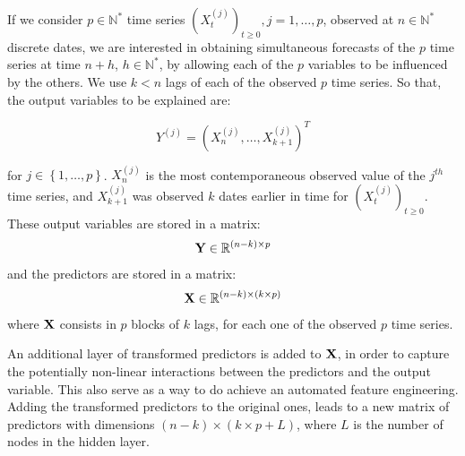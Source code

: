 \medskip

If we consider $p \in \mathbb{N}^*$ time series $(X_t^{(j)})_{t \geq 0}, j = 1, \ldots, p$, observed at $n \in \mathbb{N}^*$ discrete dates, we are interested in
obtaining simultaneous forecasts of the $p$ time series at time $n+h$, $h \in
\mathbb{N}^*$, by allowing each of the $p$ variables to be influenced by the
others. We use $k < n$ lags of each of the observed $p$ time
series. So that, the output variables to be explained are:

\begin{equation}
Y^{(j)} = \left(X^{(j)}_n, \ldots, X^{(j)}_{k+1} \right)^T
\end{equation}

for $j \in \left\lbrace 1, \ldots,
p \right\rbrace$. $X^{(j)}_n$ is the most contemporaneous observed value
of the $j^{th}$ time series, and $X^{(j)}_{k+1}$ was observed $k$ dates earlier
in time for $(X^{(j)}_t)_{t \geq 0}$. These output variables are stored in a
matrix: $$ {\bf Y} \in \mathbb{R}^{(n-k) \times p} $$ and the predictors are
stored in a matrix: $$ {\bf X} \in \mathbb{R}^{(n-k) \times (k \times p)} $$
where ${\bf X}$ consists in $p$ blocks of $k$ lags, for each one of the observed
$p$ time series.

\medskip

An additional layer of transformed  predictors
is added to ${\bf X}$, in order to capture the potentially non-linear
interactions between the predictors and the output variable. This also serve as a way to do achieve an automated feature engineering. Adding the transformed predictors to the original ones, leads to a new matrix of predictors with dimensions $(n-k) \times (k \times p + L)$, where $L$ is the number of nodes in the hidden layer.

\medskip

